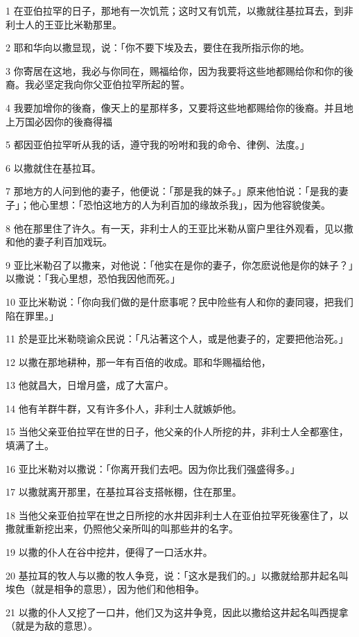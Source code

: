 \par 1 在亚伯拉罕的日子，那地有一次饥荒；这时又有饥荒，以撒就往基拉耳去，到非利士人的王亚比米勒那里。
\par 2 耶和华向以撒显现，说：「你不要下埃及去，要住在我所指示你的地。
\par 3 你寄居在这地，我必与你同在，赐福给你，因为我要将这些地都赐给你和你的後裔。我必坚定我向你父亚伯拉罕所起的誓。
\par 4 我要加增你的後裔，像天上的星那样多，又要将这些地都赐给你的後裔。并且地上万国必因你的後裔得福
\par 5 都因亚伯拉罕听从我的话，遵守我的吩咐和我的命令、律例、法度。」
\par 6 以撒就住在基拉耳。
\par 7 那地方的人问到他的妻子，他便说：「那是我的妹子。」原来他怕说：「是我的妻子」；他心里想：「恐怕这地方的人为利百加的缘故杀我」，因为他容貌俊美。
\par 8 他在那里住了许久。有一天，非利士人的王亚比米勒从窗户里往外观看，见以撒和他的妻子利百加戏玩。
\par 9 亚比米勒召了以撒来，对他说：「他实在是你的妻子，你怎麽说他是你的妹子？」以撒说：「我心里想，恐怕我因他而死。」
\par 10 亚比米勒说：「你向我们做的是什麽事呢？民中险些有人和你的妻同寝，把我们陷在罪里。」
\par 11 於是亚比米勒晓谕众民说：「凡沾著这个人，或是他妻子的，定要把他治死。」
\par 12 以撒在那地耕种，那一年有百倍的收成。耶和华赐福给他，
\par 13 他就昌大，日增月盛，成了大富户。
\par 14 他有羊群牛群，又有许多仆人，非利士人就嫉妒他。
\par 15 当他父亲亚伯拉罕在世的日子，他父亲的仆人所挖的井，非利士人全都塞住，填满了土。
\par 16 亚比米勒对以撒说：「你离开我们去吧。因为你比我们强盛得多。」
\par 17 以撒就离开那里，在基拉耳谷支搭帐棚，住在那里。
\par 18 当他父亲亚伯拉罕在世之日所挖的水井因非利士人在亚伯拉罕死後塞住了，以撒就重新挖出来，仍照他父亲所叫的叫那些井的名字。
\par 19 以撒的仆人在谷中挖井，便得了一口活水井。
\par 20 基拉耳的牧人与以撒的牧人争竞，说：「这水是我们的。」以撒就给那井起名叫埃色（就是相争的意思），因为他们和他相争。
\par 21 以撒的仆人又挖了一口井，他们又为这井争竞，因此以撒给这井起名叫西提拿（就是为敌的意思）。
